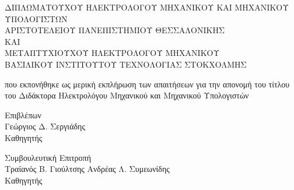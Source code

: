 \begin{center}
   \vspace{0.5cm}

   {\footnotesize ΔΙΠΛΩΜΑΤΟΥΧΟΥ ΗΛΕΚΤΡΟΛΟΓΟΥ ΜΗΧΑΝΙΚΟΥ ΚΑΙ ΜΗΧΑΝΙΚΟΥ ΥΠΟΛΟΓΙΣΤΩΝ\\}
   {\footnotesize ΑΡΙΣΤΟΤΕΛΕΙΟΥ ΠΑΝΕΠΙΣΤΗΜΙΟΥ ΘΕΣΣΑΛΟΝΙΚΗΣ\\}
   {\footnotesize ΚΑΙ\\}
   {\footnotesize ΜΕΤΑΠΤΥΧΙΟΥΧΟΥ ΗΛΕΚΤΡΟΛΟΓΟΥ ΜΗΧΑΝΙΚΟΥ\\}
   {\footnotesize ΒΑΣΙΛΙΚΟΥ ΙΝΣΤΙΤΟΥΤΟΥ ΤΕΧΝΟΛΟΓΙΑΣ ΣΤΟΚΧΟΛΜΗΣ\\}

   \vspace{1.0cm}

   {που εκπονήθηκε ως μερική εκπλήρωση των απαιτήσεων για την απονομή του
   τίτλου του Διδάκτορα Ηλεκτρολόγου Μηχανικού και Μηχανικού Υπολογιστών}

   \vspace{1.8cm}

   {Επιβλέπων\\}
   \vspace{-0.2cm}
   {Γεώργιος Δ. Σεργιάδης\\}
   \vspace{-0.2cm}
   {Καθηγητής}

   \vspace{0.7cm}

   {Συμβουλευτική Επιτροπή\\}
   {Τραϊανός Β. Γιούλτσης} \hspace{5cm} {Ανδρέας Λ. Συμεωνίδης\\}
   \vspace{-0.2cm}
   \hspace{1.2cm}{Καθηγητής}             \hspace{5.8cm} {Καθηγητής}

\end{center}
